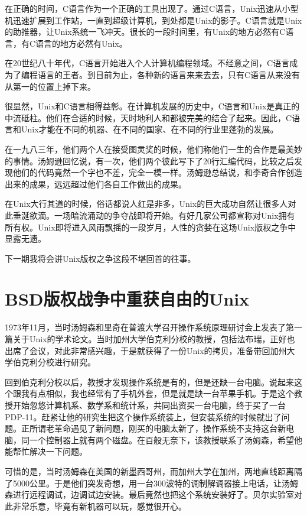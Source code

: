 \documentclass[
  letterpaper,
  DIV=11,
  numbers=noendperiod]{scrreprt}
\begin{document}
在正确的时间，C语言作为一个正确的工具出现了。通过C语言，Unix迅速从小型机迅速扩展到工作站，一直到超级计算机，到处都是Unix的影子。C语言就是Unix的助推器，让Unix系统一飞冲天。很长的一段时间里，有Unix的地方必然有C语言，有C语言的地方必然有Unix。

在20世纪八十年代，C语言开始进入个人计算机编程领域。不经意之间，C语言成为了编程语言的王者。到目前为止，各种新的语言来来去去，只有C语言从来没有从第一的位置上掉下来。

很显然，Unix和C语言相得益彰。在计算机发展的历史中，C语言和Unix是真正的中流砥柱。他们在合适的时候，天时地利人和都被完美的结合了起来。因此，C语言和Unix才能在不同的机器、在不同的国家、在不同的行业里蓬勃的发展。

在一九八三年，他们两个人在接受图灵奖的时候，他们称他们一生的合作是最美妙的事情。汤姆逊回忆说，有一次，他们两个彼此写下了20行汇编代码，比较之后发现他们的代码竟然一个字也不差，完全一模一样。汤姆逊总结说，和李奇合作创造出来的成果，远远超过他们各自工作做出的成果。

在Unix大行其道的时候，俗话都说人红是非多，Unix的巨大成功自然让很多人对此垂涎欲滴。一场暗流涌动的争夺战即将开始。有好几家公司都宣称对Unix拥有所有权。Unix即将进入风雨飘摇的一段岁月，人性的贪婪在这场Unix版权之争中显露无遗。

下一期我将会讲Unix版权之争这段不堪回首的往事。


\chapter{BSD版权战争中重获自由的Unix}\label{bsdux7248ux6743ux6218ux4e89ux4e2dux91cdux83b7ux81eaux7531ux7684unix}

1973年11月，当时汤姆森和里奇在普渡大学召开操作系统原理研讨会上发表了第一篇关于Unix的学术论文。当时加州大学伯克利分校的教授，包括法布瑞，正好也出席了会议，对此非常感兴趣，于是就获得了一份Unix的拷贝，准备带回加州大学伯克利分校进行研究。

回到伯克利分校以后，教授才发现操作系统是有的，但是还缺一台电脑。说起来这个跟我有点相似，我也经常有了手机外套，但是就是缺一台苹果手机。于是这个教授开始忽悠计算机系、数学系和统计系，共同出资买一台电脑，终于买了一台PDP-11。赶紧让他的研究生把这个操作系统装上，但安装系统的时候就出了问题。正所谓老革命遇见了新问题，刚买的电脑太新了，操作系统不支持这台新电脑，同一个控制器上就有两个磁盘。在百般无奈下，该教授联系了汤姆森，希望他能帮忙解决一下问题。

可惜的是，当时汤姆森在美国的新墨西哥州，而加州大学在加州，两地直线距离隔了5000公里。于是他们突发奇想，用一台300波特的调制解调器接上电话，让汤姆森进行远程调试，边调试边安装。最后竟然也把这个系统安装好了。贝尔实验室对此非常乐意，毕竟有新机器可以玩，感觉很开心。
\end{document}
